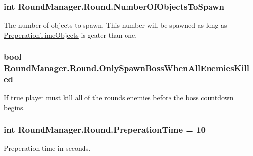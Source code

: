 \subsubsection[{Number\+Of\+Objects\+To\+Spawn}]{\setlength{\rightskip}{0pt plus 5cm}int Round\+Manager.\+Round.\+Number\+Of\+Objects\+To\+Spawn}\label{class_round_manager_1_1_round_ae42e5ac4d526b13e552f1b24e5a83a19}


The number of objects to spawn. This number will be spawned as long as \hyperlink{class_round_manager_1_1_round_a1e58477543ce08f5fd2a436ebadbcc7c}{Preperation\+Time\+Objects} is geater than one. 

\hypertarget{class_round_manager_1_1_round_ac82296cb0b990188a4a1426cb07c1bb7}{}
\subsubsection[{Only\+Spawn\+Boss\+When\+All\+Enemies\+Killed}]{\setlength{\rightskip}{0pt plus 5cm}bool Round\+Manager.\+Round.\+Only\+Spawn\+Boss\+When\+All\+Enemies\+Killed}\label{class_round_manager_1_1_round_ac82296cb0b990188a4a1426cb07c1bb7}


If true player must kill all of the rounds enemies before the boss countdown begins. 

\hypertarget{class_round_manager_1_1_round_a5a70ef04a60e0aeddaf1cd1898a419e5}{}
\subsubsection[{Preperation\+Time}]{\setlength{\rightskip}{0pt plus 5cm}int Round\+Manager.\+Round.\+Preperation\+Time = 10}\label{class_round_manager_1_1_round_a5a70ef04a60e0aeddaf1cd1898a419e5}


Preperation time in seconds. 

\hypertarget{class_round_manager_1_1_round_a1e58477543ce08f5fd2a436ebadbcc7c}{}
